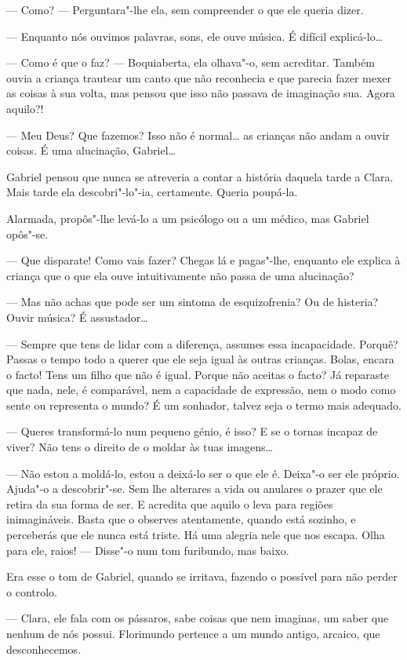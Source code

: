 --- Como? --- Perguntara"-lhe ela, sem compreender o que ele queria dizer.

--- Enquanto nós ouvimos palavras, sons, ele ouve música. É difícil
explicá-lo\ldots{}

--- Como é que o faz? --- Boquiaberta, ela olhava"-o, sem acreditar. Também
ouvia a criança trautear um canto que não reconhecia e que parecia fazer
mexer as coisas à sua volta, mas pensou que isso não passava de
imaginação sua. Agora aquilo?!

--- Meu Deus? Que fazemos? Isso não é normal\ldots{} as crianças não andam a
ouvir coisas. É uma alucinação, Gabriel\ldots{}

Gabriel pensou que nunca se atreveria a contar a história daquela tarde
a Clara. Mais tarde ela descobri"-lo"-ia, certamente. Queria poupá-la.

Alarmada, propôs"-lhe levá-lo a um psicólogo ou a um médico, mas Gabriel
opôs"-se.

--- Que disparate! Como vais fazer? Chegas lá e pagas"-lhe, enquanto ele
explica à criança que o que ela ouve intuitivamente não passa de uma
alucinação?

--- Mas não achas que pode ser um sintoma de esquizofrenia? Ou de
histeria? Ouvir música? É assustador\ldots{}

--- Sempre que tens de lidar com a diferença, assumes essa incapacidade.
Porquê? Passas o tempo todo a querer que ele seja igual às outras
crianças. Bolas, encara o facto! Tens um filho que não é igual. Porque
não aceitas o facto? Já reparaste que nada, nele, é comparável, nem a
capacidade de expressão, nem o modo como sente ou representa o mundo? É
um sonhador, talvez seja o termo mais adequado.

--- Queres transformá-lo num pequeno génio, é isso? E se o tornas incapaz
de viver? Não tens o direito de o moldar às tuas imagens\ldots{}

--- Não estou a moldá-lo, estou a deixá-lo ser o que ele é. Deixa"-o ser
ele próprio. Ajuda"-o a descobrir"-se. Sem lhe alterares a vida ou
anulares o prazer que ele retira da sua forma de ser. E acredita que
aquilo o leva para regiões inimagináveis. Basta que o observes
atentamente, quando está sozinho, e perceberás que ele nunca está
triste. Há uma alegria nele que nos escapa. Olha para ele, raios! ---
Disse"-o num tom furibundo, mas baixo.

Era esse o tom de Gabriel, quando se irritava, fazendo o possível para
não perder o controlo.

--- Clara, ele fala com os pássaros, sabe coisas que nem imaginas, um
saber que nenhum de nós possui. Florimundo pertence a um mundo antigo,
arcaico, que desconhecemos.

